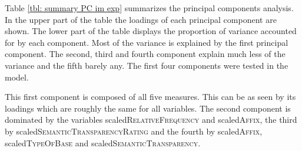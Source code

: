 Table \ref{tbl: summary PC im exp} summarizes the principal components analysis. In the upper part of the table the loadings of each principal component are shown. The lower part of the table displays the proportion of variance accounted for by each component. 
Most of the variance is explained by the first principal component. The second, third and fourth component explain much less of the variance and the fifth barely any.  The first four components were tested in the model. 


\begin{table}[H]
	\caption{ Summary of principal components}
	\label{tbl: summary PC im exp}

	\begin{center}
			\vspace*{-0.5cm}
	\end{center}
\end{table}



This first component is composed of all five measures. This can be as seen by its loadings which are roughly the same for all variables. The second component is dominated by the variables scaled\textsc{RelativeFrequency} and scaled\textsc{Affix}, the third by scaled\textsc{SemanticTransparencyRating} and the fourth by scaled\textsc{Affix}, scaled\textsc{TypeOfBase} and scaled\textsc{SemanticTransparency}. 


